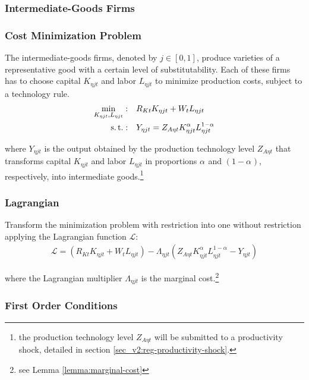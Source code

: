 \documentclass[../thesis.tex]{subfiles}
\begin{document}
\subsubsection{Intermediate-Goods Firms}

\subsubsection*{Cost Minimization Problem}

The intermediate-goods firms, denoted by $j \in [0,1]$, produce varieties of a representative good with a certain level of substitutability. Each of these firms has to choose capital $K_{\eta jt}$ and labor $L_{\eta jt}$ to minimize production costs, subject to a technology rule.
\begin{align}
	\label{eq_v2:reg-int-good-firm-total-cost}
	\min_{K_{\eta jt}, L_{\eta jt}}: \quad & R_{Kt} K_{\eta jt} + W_t L_{\eta jt} \\
	\label{eq_v2:reg-int-good-firm-production-function}
	\operatorname{s.t.}: \quad & Y_{\eta jt} = Z_{A\eta t} K_{\eta jt}^{\alpha_{}} L_{\eta jt}^{1-{\alpha_{}}}
\end{align}

where $Y_{\eta jt}$ is the output obtained by the production technology level $Z_{A\eta t}$ that transforms capital $K_{\eta jt}$ and labor $L_{\eta jt}$ in proportions ${\alpha_{}}$ and $(1-{\alpha_{}})$, respectively, into intermediate goods.\footnote{the production technology level $Z_{A\eta t}$ will be submitted to a productivity shock, detailed in section \ref{sec_v2:reg-productivity-shock}.}

\subsubsection*{Lagrangian}

Transform the minimization problem with restriction into one without restriction applying the Lagrangian function $\mathcal{L}$:
\begin{align}
	\label{eq_v2:reg-int-good-firm-lagrangian}
	\mathcal{L} = (R_{Kt} K_{\eta jt} + W_t L_{\eta jt}) - \Lambda_{\eta jt} (Z_{A\eta t} K_{\eta jt}^{\alpha_{}} L_{\eta jt}^{1-{\alpha_{}}} - Y_{\eta jt})
\end{align}

where the Lagrangian multiplier $\Lambda_{\eta jt}$ is the marginal cost.\footnote{see Lemma \ref{lemma:marginal-cost}}

\subsubsection*{First Order Conditions}
\end{document}
